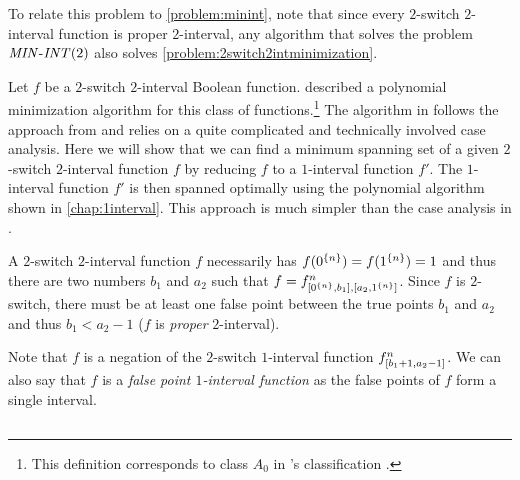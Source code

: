 To relate this problem to \cref{problem:minint},
note that
since every $2$-switch $2$-interval function
is proper $2$-interval,
any algorithm that solves the problem $\mathit{MIN\text{-}INT} (2)$
also solves \cref{problem:2switch2intminimization}.

Let $f$ be a $2$-switch $2$-interval Boolean function.
\citeauthor{Dubovsky2012} described a polynomial
minimization algorithm for this class of
functions.\footnote{This definition corresponds to
class $A_0$
in \citeauthor{Dubovsky2012}'s classification
\citep[p.~5]{Dubovsky2012}.}
The algorithm in \citet[p.~17]{Dubovsky2012}
follows the approach from \citet{Schieber2005154}
and relies on a quite complicated and technically involved case analysis.
Here we will show that we can find a minimum spanning set of a given $2$-switch $2$-interval function $f$ by reducing $f$ to a $1$-interval function $f'$.
The $1$-interval function $f'$ is then spanned optimally
using the polynomial algorithm
shown in \cref{chap:1interval}.
This approach is much simpler
than the case analysis in \citet{Dubovsky2012}.

A $2$-switch $2$-interval function $f$ necessarily has $f(0^{\{n\}})=f(1^{\{n\}})=1$
and thus there are two numbers $b_1$ and $a_2$
such that $f = f^{n}_{[0^{\{n\}}, b_1], [a_2, 1^{\{n\}}]}$.
Since $f$ is $2$-switch,
there must be at least one false point
between the true points $b_1$ and $a_2$
and thus $b_1 < a_2-1$
($f$ is \emph{proper} $2$-interval).

Note that $f$ is a negation
of the $2$-switch $1$-interval
function $f^n_{[b_1 + 1, a_2 - 1]}$.
We can also say that $f$ is a \emph{false point $1$-interval function}
as the false points of $f$ form a single interval.

\subsection{\algdesctitle}

